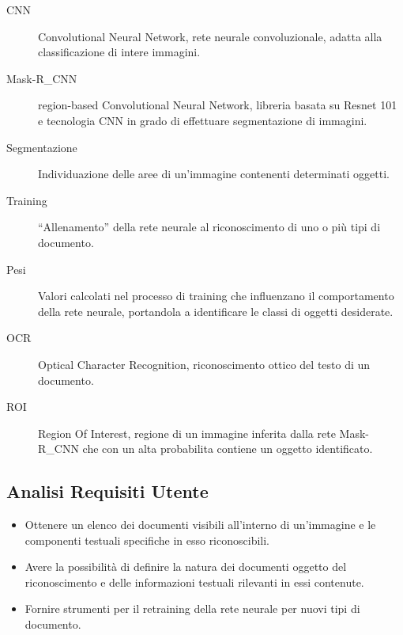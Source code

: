 \documentclass[12pt,a4paper]{article}
\begin{document}
\begin{description}
    \item[CNN] Convolutional Neural Network, rete neurale
        convoluzionale, adatta alla classificazione di intere immagini.

    \item[Mask-R\_CNN] region-based Convolutional Neural Network, libreria
        basata su Resnet 101 e tecnologia CNN in grado di effettuare
        segmentazione di immagini.

    \item[Segmentazione] Individuazione delle aree di un'immagine
        contenenti determinati oggetti.

    \item[Training] ``Allenamento'' della rete neurale al riconoscimento
        di uno o più tipi di documento.

    \item[Pesi] Valori calcolati nel processo di training che
        influenzano il comportamento della rete neurale, portandola a
        identificare le classi di oggetti desiderate.

    \item[OCR] Optical Character Recognition, riconoscimento ottico del
        testo di un documento.

    \item[ROI] Region Of Interest, regione di un immagine inferita dalla
        rete Mask-R\_CNN che con un alta probabilita contiene un oggetto
        identificato.

\end{description}

\subsection{Analisi Requisiti Utente}

\begin{itemize}
    \item Ottenere un elenco dei documenti visibili all'interno di
        un'immagine e le componenti testuali specifiche in esso
        riconoscibili.
    \item Avere la possibilità di definire la natura dei documenti
        oggetto del riconoscimento e delle informazioni testuali
        rilevanti in essi contenute.
    \item Fornire strumenti per il retraining della rete neurale per
        nuovi tipi di documento.
\end{itemize}
\end{document}
